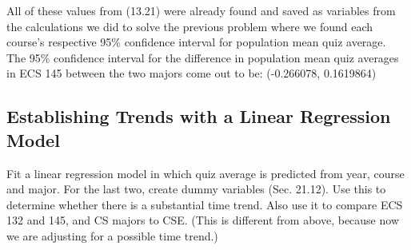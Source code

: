 \documentclass{article}
\begin{document}
\begin{itemize}
            All of these values from (13.21) were already found and saved as variables from the calculations we did to solve the previous problem where we found each course's respective 95\% confidence interval for population mean quiz average. \\
            
            The 95\% confidence interval for the difference in population mean quiz averages in ECS 145 between the two majors come out to be: (-0.266078, 0.1619864)

    \end{itemize}
        \subsection{Establishing Trends with a Linear Regression Model}
        \item Fit a linear regression model in which quiz average is predicted from year, course and major. For the last two, create dummy variables (Sec. 21.12). Use this to determine whether there is a substantial time trend. Also use it to compare ECS 132 and 145, and CS majors to CSE. (This is different from above, because now we are adjusting for a possible time trend.)
        
\end{document}
